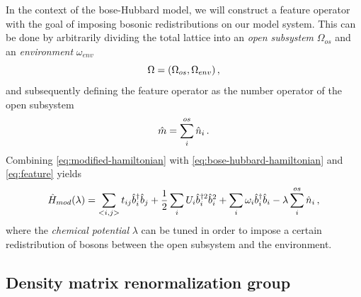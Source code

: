 \documentclass[twoside,twocolumn,9pt]{article}
\begin{document}
In the context of the bose-Hubbard model, we will construct a feature operator with the goal of imposing bosonic redistributions on our model system. This can be done by arbitrarily dividing the total lattice into an \emph{open subsystem} $\Omega_{os}$ and an \emph{environment} $\omega_{env}$
\begin{equation}
  \Omega = (\Omega_{os}, \Omega_{env}) \thinspace ,
\end{equation} 
and subsequently defining the feature operator as the number operator of the open subsystem
\begin{equation}
  \hat{m} = \sum_i^{os}\hat{n}_i \thinspace .
  \label{eq:feature}
\end{equation}
Combining \cref{eq:modified-hamiltonian} with \cref{eq:bose-hubbard-hamiltonian} and \cref{eq:feature} yields
\begin{equation}
  \hat{H}_{mod}(\lambda) = \sum_{<i,j>} t_{ij}\hat{b}_i^\dagger \hat{b}_j + \frac{1}{2}\sum_i U_i\hat{b}_i^{\dagger 2} \hat{b}_i^{2} + \sum_i \omega_i \hat{b}_i^\dagger \hat{b}_i - \lambda\sum_i^{os}\hat{n}_i \thinspace ,
\end{equation}
where the \emph{chemical potential} $\lambda$ can be tuned in order to impose a certain redistribution of bosons between the open subsystem and the environment.

\subsection{Density matrix renormalization group}
\end{document}
